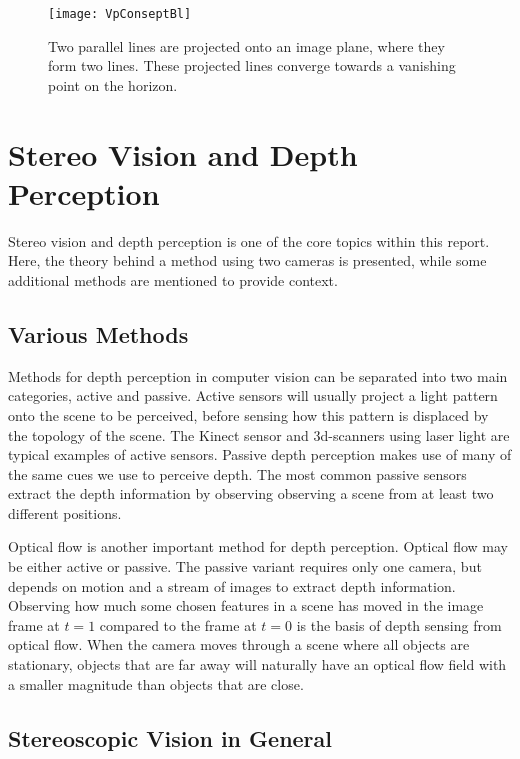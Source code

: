 \begin{wrapfigure}{r}{0.5\textwidth}
	\vspace{-10pt} %
	\centering
	\texttt{[image: VpConseptBl]}
	\caption{\label{fig:VpConseptBl}Two parallel lines are projected onto an image plane, where they form two lines. These projected lines converge towards a vanishing point on the horizon.}
	\vspace{-10pt} %
\end{wrapfigure}

\section{Stereo Vision and Depth Perception}

Stereo vision and depth perception is one of the core topics within this report. Here, the theory behind a method using two cameras is presented, while some additional methods are mentioned to provide context. 

\subsection{Various Methods}

Methods for depth perception in computer vision can be separated into two main categories, active and passive. Active sensors will usually project a light pattern onto the scene to be perceived, before sensing how this pattern is displaced by the topology of the scene. The Kinect sensor and 3d-scanners using laser light are typical examples of active sensors. Passive depth perception makes use of many of the same cues we use to perceive depth. The most common passive sensors extract the depth information by observing observing a scene from at least two different positions. 

Optical flow is another important method for depth perception. Optical flow may be either active or passive. The passive variant requires  only one camera, but depends on motion and a stream of images to extract depth information. Observing how much some chosen features in a scene has moved in the image frame at $t = 1$ compared to the frame at $t = 0$ is the basis of depth sensing from optical flow. When the camera moves through a scene where all objects are stationary, objects that are far away will naturally have an optical flow field with a smaller magnitude than objects that are close. 

\subsection{Stereoscopic Vision in General}

